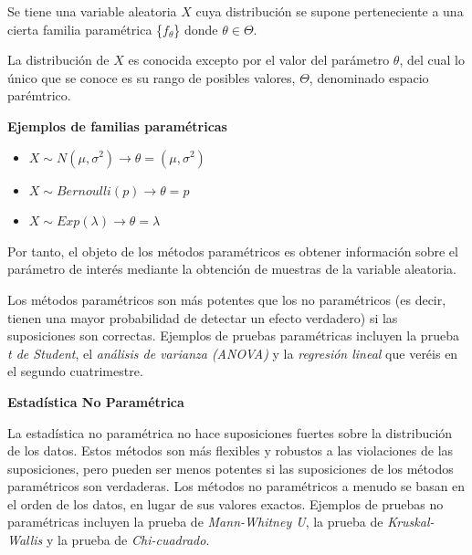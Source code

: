 \documentclass[
  letterpaper,
  DIV=11,
  numbers=noendperiod]{scrreprt}
\providecommand{\tightlist}{%
  \setlength{\itemsep}{0pt}\setlength{\parskip}{0pt}}\usepackage{longtable,booktabs,array}
\begin{document}
\begin{tcolorbox}[enhanced jigsaw, arc=.35mm, breakable, coltitle=black, left=2mm, opacityback=0, bottomtitle=1mm, colbacktitle=quarto-callout-tip-color!10!white, title=\textcolor{quarto-callout-tip-color}{\faLightbulb}\hspace{0.5em}{Familias paramétricas}, titlerule=0mm, colback=white, colframe=quarto-callout-tip-color-frame, bottomrule=.15mm, rightrule=.15mm, opacitybacktitle=0.6, toptitle=1mm, toprule=.15mm, leftrule=.75mm]

Se tiene una variable aleatoria \(X\) cuya distribución se supone
perteneciente a una cierta familia paramétrica \{\(f_\theta\)\} donde
\(\theta \in \Theta\).

La distribución de \(X\) es conocida excepto por el valor del parámetro
\(\theta\), del cual lo único que se conoce es su rango de posibles
valores, \(\Theta\), denominado espacio parémtrico.

\textbf{Ejemplos de familias paramétricas}

\begin{itemize}
\tightlist
\item
  \(X \sim N(\mu,\sigma^2) \rightarrow \theta=(\mu,\sigma^2)\)
\item
  \(X \sim Bernoulli(p) \rightarrow \theta=p\)
\item
  \(X \sim Exp(\lambda) \rightarrow \theta=\lambda\)
\end{itemize}

\end{tcolorbox}

Por tanto, el objeto de los métodos paramétricos es obtener información
sobre el parámetro de interés mediante la obtención de muestras de la
variable aleatoria.

Los métodos paramétricos son más potentes que los no paramétricos (es
decir, tienen una mayor probabilidad de detectar un efecto verdadero) si
las suposiciones son correctas. Ejemplos de pruebas paramétricas
incluyen la prueba \emph{t de Student}, el \emph{análisis de varianza
(ANOVA)} y la \emph{regresión lineal} que veréis en el segundo
cuatrimestre.

\textbf{Estadística No Paramétrica}

La estadística no paramétrica no hace suposiciones fuertes sobre la
distribución de los datos. Estos métodos son más flexibles y robustos a
las violaciones de las suposiciones, pero pueden ser menos potentes si
las suposiciones de los métodos paramétricos son verdaderas. Los métodos
no paramétricos a menudo se basan en el orden de los datos, en lugar de
sus valores exactos. Ejemplos de pruebas no paramétricas incluyen la
prueba de \emph{Mann-Whitney U}, la prueba de \emph{Kruskal-Wallis} y la
prueba de \emph{Chi-cuadrado}.
\end{document}
